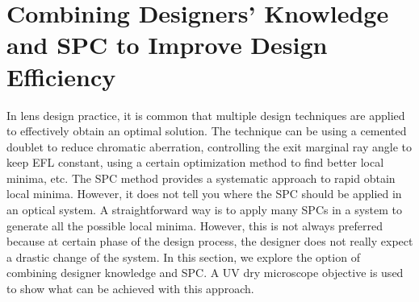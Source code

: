 \section{Combining Designers' Knowledge and SPC to Improve Design Efficiency}
In lens design practice, it is common that multiple design techniques are applied to effectively obtain an optimal solution. The technique can be using a cemented doublet to reduce chromatic aberration, controlling the exit marginal ray angle to keep EFL constant, using a certain optimization method to find better local minima, etc. The SPC method provides a systematic approach to rapid obtain local minima. However, it does not tell you where the SPC should be applied in an optical system. A straightforward way is to apply many SPCs in a system to generate all the possible local minima. However, this is not always preferred because at certain phase of the design process, the designer does not really expect a drastic change of the system. In this section, we explore the option of combining designer knowledge and SPC. A UV dry microscope objective is used to show what can be achieved with this approach. 

